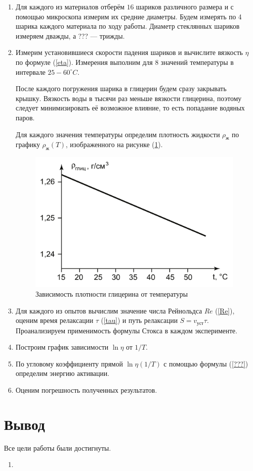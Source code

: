 \documentclass[a4paper,12pt]{article} %
\begin{document}
\begin{enumerate}
  \item Для каждого из материалов отберём $16$ шариков различного размера и с помощью микроскопа измерим их средние диаметры. Будем измерять по 4 шарика каждого материала по ходу работы. Диаметр стеклянных шариков измеряем дважды, а ??? — трижды.
  
  \item Измерим установившиеся скорости падения шариков и вычислите вязкость $\eta$ по формуле (\ref{eta}). Измерения выполним для $8$ значений температуры в интервале $25-60 ^\circ C$. 
  
	После каждого погружения шарика в глицерин будем сразу закрывать крышку. Вязкость воды в тысячи раз меньше вязкости глицерина, поэтому следует минимизировать её возможное влияние, то есть попадание водяных паров.
	
	Для каждого значения температуры определим плотность жидкости $\rho_\text{ж}$ по графику $\rho_\text{ж} (T)$, изображенного на рисунке (\ref{fig:rho_T}).
  
	\begin{figure}[h!]
		\centering
		\includegraphics[scale = 0.35]{rho_t.png}
		\caption{Зависимость плотности глицерина от температуры}
		\label{fig:rho_T}
	\end{figure}
  
  \item Для каждого из опытов вычислим значение числа Рейнольдса $Re$ (\ref{Re}), оценим время релаксации $\tau$ (\ref{tau}) и путь релаксации $S = v_\text{уст} \tau$. Проанализируем применимость формулы Стокса в каждом эксперименте.
  
  \item Построим график зависимости $\ln \eta$ от $1/T$.
  
  \item По угловому коэффициенту прямой $\ln \eta (1/T)$ с помощью формулы (\ref{???}) определим энергию активации. 
  
	\item Оценим погрешность полученных результатов.
\end{enumerate}

\section*{Вывод}

Все цели работы были достигнуты.

\begin{enumerate}
	\item 
\end{enumerate}
\end{document}
